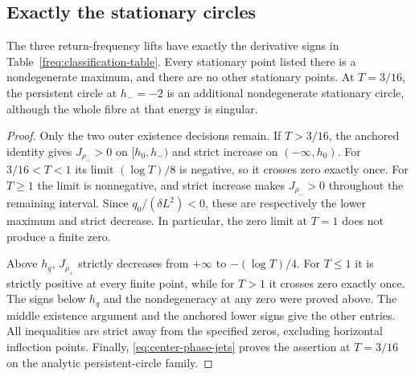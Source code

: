 \subsection{Exactly the stationary circles}

\begin{proposition}\label{prop:frequency}
The three return-frequency lifts have exactly the derivative signs
in Table~\ref{freq:classification-table}.  Every stationary point
listed there is a nondegenerate maximum, and there are no other
stationary points.  At $T=3/16$, the persistent circle at $h_-=-2$
is an additional nondegenerate stationary circle, although the whole
fibre at that energy is singular.
\end{proposition}

\begin{proof}
Only the two outer existence decisions remain.  If $T>3/16$, the
anchored identity gives $J_{\rho_-}>0$ on $[h_0,h_-)$ and strict
increase on $(-\infty,h_0)$.  For $3/16<T<1$ its limit
$(\log T)/8$ is negative, so it crosses zero exactly once.
For $T\ge1$ the limit is nonnegative, and strict increase makes
$J_{\rho_-}>0$ throughout the remaining interval.  Since
$q_0/(\delta L^2)<0$, these are respectively the lower maximum
and strict decrease.  In particular, the zero limit at $T=1$
does not produce a finite zero.

Above $h_q$, $J_{\rho_+}$ strictly decreases from $+\infty$ to
$-(\log T)/4$.  For $T\le1$ it is strictly positive at every finite
point, while for $T>1$ it crosses zero exactly once.  The signs
below $h_q$ and the nondegeneracy at any zero were proved above.
The middle existence argument and the anchored lower signs give
the other entries.  All inequalities are strict away from the
specified zeros, excluding horizontal inflection points.
Finally, \eqref{eq:center-phase-jets} proves the assertion at
$T=3/16$ on the analytic persistent-circle family.
\end{proof}

